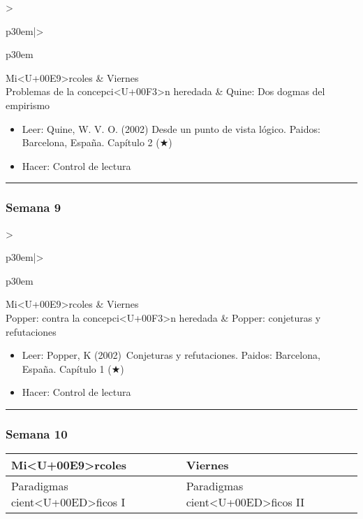 \documentclass[spanish,]{article}
\begin{document}
\begin{tabular}{>{\raggedright\arraybackslash}p{30em}|>{\raggedright\arraybackslash}p{30em}}
\hline
Mi<U+00E9>rcoles & Viernes\\
\hline
Problemas de la concepci<U+00F3>n heredada & Quine: Dos dogmas del empirismo\\
\hline
\end{tabular}

\begin{itemize}
\item
  Leer: Quine, W. V. O. (2002) Desde un punto de vista lógico. Paidos:
  Barcelona, España. Capítulo 2 (★)
\item
  Hacer: Control de lectura
\end{itemize}

\begin{center}\rule{0.5\linewidth}{\linethickness}\end{center}

\subsubsection{Semana 9}\label{semana-9}

\begin{tabular}{>{\raggedright\arraybackslash}p{30em}|>{\raggedright\arraybackslash}p{30em}}
\hline
Mi<U+00E9>rcoles & Viernes\\
\hline
Popper: contra la concepci<U+00F3>n heredada & Popper: conjeturas y refutaciones\\
\hline
\end{tabular}

\begin{itemize}
\item
  Leer: Popper, K (2002)~Conjeturas y refutaciones. Paidos: Barcelona,
  España. Capítulo 1 (★)
\item
  Hacer: Control de lectura
\end{itemize}

\begin{center}\rule{0.5\linewidth}{\linethickness}\end{center}

\subsubsection{Semana 10}\label{semana-10}

\begin{tabular}{>{\raggedright\arraybackslash}p{30em}|>{\raggedright\arraybackslash}p{30em}}
\hline
Mi<U+00E9>rcoles & Viernes\\
\hline
Paradigmas cient<U+00ED>ficos I & Paradigmas cient<U+00ED>ficos II\\
\hline
\end{tabular}
\end{document}
